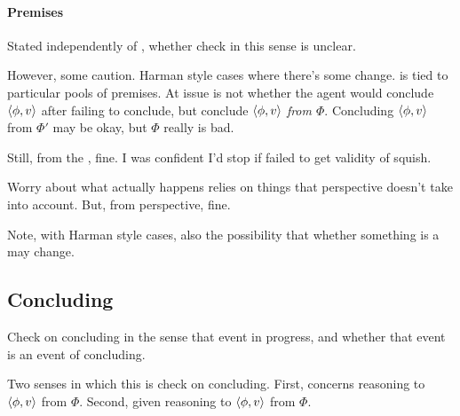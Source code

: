 \paragraph{Premises}

\begin{note}
  Stated independently of \agpe{}, whether check in this sense is unclear.

  However, some caution.
  Harman style cases where there's some change.
  \curb{} is tied to particular pools of premises.
  At issue is not whether the agent would conclude \(\langle \phi, v \rangle\) after failing to conclude, but conclude \(\langle \phi, v \rangle\) \emph{from \(\Phi\)}.
  Concluding \(\langle \phi, v \rangle\) from \(\Phi'\) may be okay, but \(\Phi\) really is bad.

  Still, from the \agpe{}, fine.
  I was confident I'd stop if failed to get validity of squish.

  Worry about what actually happens relies on things that perspective doesn't take into account.
  But, from perspective, fine.

  Note, with Harman style cases, also the possibility that whether something is a \curb{} may change.
\end{note}

\subsection{Concluding}

\begin{note}
  Check on concluding in the sense that event in progress, and whether that event is an event of concluding.

  {
    \color{red}
    Two senses in which this is check on concluding.
    First, concerns reasoning to \(\langle \phi, v \rangle\) from \(\Phi\).
    Second, given reasoning to \(\langle \phi, v \rangle\) from \(\Phi\).
  }
\end{note}


